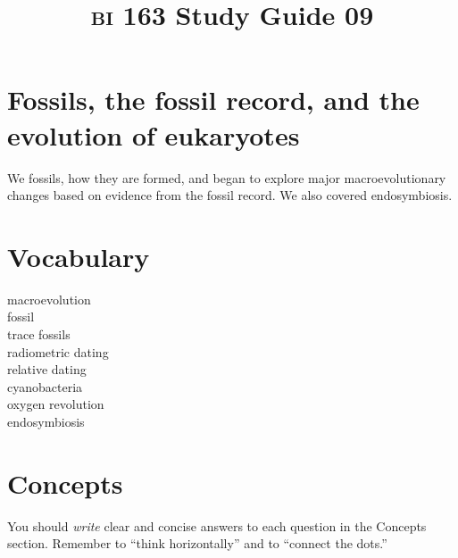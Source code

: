 \documentclass[letterpaper]{tufte-handout}
\title{{\scshape bi} 163 Study Guide 09}
\date{} %
\begin{document}
\maketitle	%

\section*{Fossils, the fossil record, and the evolution of eukaryotes }

We fossils, how they are formed, and began to explore major macroevolutionary changes based on evidence from the fossil record. We also covered endosymbiosis.

\section*{Vocabulary}

\vspace{-1\baselineskip}
\begin{multicols}{2}
macroevolution \\
fossil\\
trace fossils \\
radiometric dating \\
relative dating \\
cyanobacteria \\
oxygen revolution \\
endosymbiosis
\end{multicols}

\section*{Concepts}

You should \emph{write} clear and concise answers to each question in the Concepts section.  Remember to ``think horizontally'' and to ``connect the dots.'' 
\end{document}
